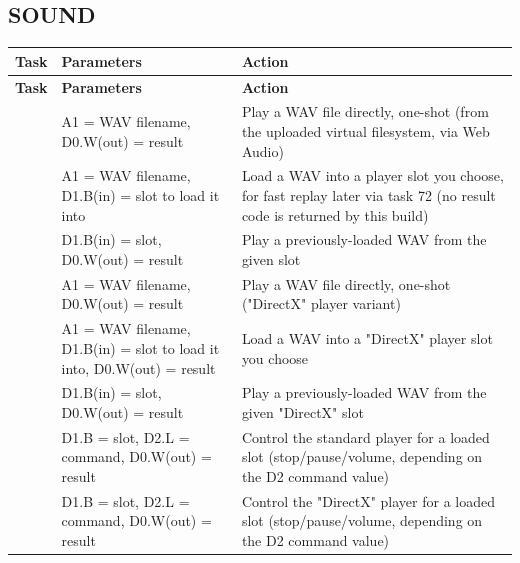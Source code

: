 \subsection*{SOUND}
\begin{longtable}{@{}p{1.7cm}p{5.2cm}p{7.3cm}@{}}
\toprule
\textbf{Task} & \textbf{Parameters} & \textbf{Action} \\
\midrule
\endfirsthead
\toprule
\textbf{Task} & \textbf{Parameters} & \textbf{Action} \\
\midrule
\endhead
\ttfamily 70 & A1 = WAV filename, D0.W(out) = result & Play a WAV file directly, one-shot (from the uploaded virtual filesystem, via Web Audio) \\
\ttfamily 71 & A1 = WAV filename, D1.B(in) = slot to load it into & Load a WAV into a player slot you choose, for fast replay later via task 72 (no result code is returned by this build) \\
\ttfamily 72 & D1.B(in) = slot, D0.W(out) = result & Play a previously-loaded WAV from the given slot \\
\ttfamily 73 & A1 = WAV filename, D0.W(out) = result & Play a WAV file directly, one-shot ("DirectX" player variant) \\
\ttfamily 74 & A1 = WAV filename, D1.B(in) = slot to load it into, D0.W(out) = result & Load a WAV into a "DirectX" player slot you choose \\
\ttfamily 75 & D1.B(in) = slot, D0.W(out) = result & Play a previously-loaded WAV from the given "DirectX" slot \\
\ttfamily 76 & D1.B = slot, D2.L = command, D0.W(out) = result & Control the standard player for a loaded slot (stop/pause/volume, depending on the D2 command value) \\
\ttfamily 77 & D1.B = slot, D2.L = command, D0.W(out) = result & Control the "DirectX" player for a loaded slot (stop/pause/volume, depending on the D2 command value) \\
\bottomrule
\end{longtable}
